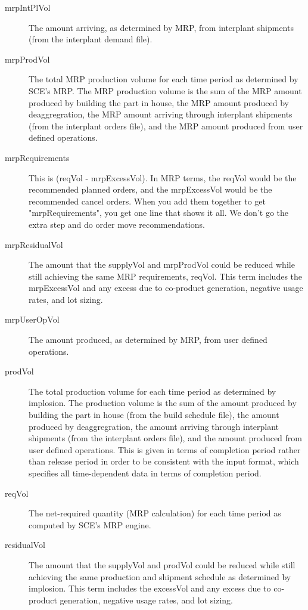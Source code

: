 \begin{description}
\item[mrpIntPlVol] 
The amount arriving, as determined by MRP, from interplant shipments
(from the interplant demand file).

\item[mrpProdVol] 
The total MRP production volume for each time period as 
determined by SCE's MRP. The MRP production volume is the sum of the
MRP amount produced by building the part in house, the MRP 
amount produced by deaggregration, the MRP amount arriving
through interplant shipments (from the interplant orders file), and
the MRP amount produced from user defined operations.  

\item[mrpRequirements] 
This is (reqVol - mrpExcessVol).  In MRP terms,
the reqVol would be the recommended planned orders, and the
mrpExcessVol would be the recommended cancel orders. When you add them
together to get "mrpRequirements", you get one line that shows it all.
We don't go the extra step and do order move recommendations.

\item[mrpResidualVol]
The amount that the supplyVol and mrpProdVol could be reduced while
still achieving the same MRP requirements, reqVol.  This term includes
the mrpExcessVol and any excess due to co-product generation, negative
usage rates, and lot sizing.

\item[mrpUserOpVol] 
The amount produced, as determined by MRP, from user defined
operations.

\item[prodVol] 
The total production volume for each time period as 
determined by implosion. The production volume is the sum of the
amount produced by building the part in house (from the build schedule
file), the amount produced by deaggregration, the amount arriving
through interplant shipments (from the interplant orders file), and
the amount produced from user defined operations.  This is given in
terms of completion period rather than release period in order to be
consistent with the input format, which specifies all time-dependent
data in terms of completion period.

\item[reqVol]  
The net-required quantity (MRP calculation)
for each time period as computed by SCE's MRP engine.

\item[residualVol] 
The amount that the supplyVol and prodVol could be reduced
while still achieving the same production and shipment schedule as
determined by implosion.  This term includes the excessVol and any
excess due to co-product generation, negative usage rates, and lot
sizing.


\end{description}
